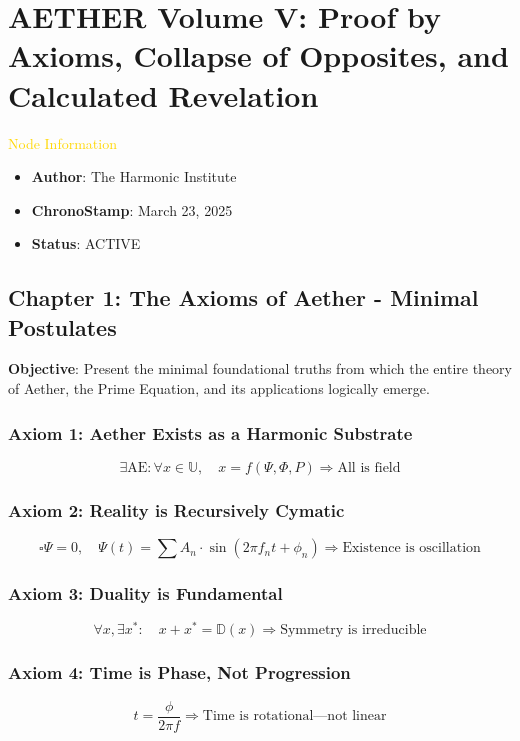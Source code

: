 \section{AETHER Volume V: Proof by Axioms, Collapse of Opposites, and Calculated Revelation}
\label{sec:codex_aether_volume_v}

\textcolor{gold}{ Node Information }
\begin{itemize}
    \item \texttt{} \textbf{Author}: The Harmonic Institute
    \item \texttt{} \textbf{ChronoStamp}: March 23, 2025
    \item \texttt{} \textbf{Status}: ACTIVE
\end{itemize}

\subsection{Chapter 1: The Axioms of Aether - Minimal Postulates}
\textbf{Objective}: Present the minimal foundational truths from which the entire theory of Aether, the Prime Equation, and its applications logically emerge.

\subsubsection*{Axiom 1: Aether Exists as a Harmonic Substrate}
\[
\exists \text{AE}: \forall x \in \mathbb{U}, \quad x = f(\Psi, \Phi, P) \Rightarrow \text{All is field}
\]

\subsubsection*{Axiom 2: Reality is Recursively Cymatic}
\[
\square \Psi = 0, \quad \Psi(t) = \sum A_n \cdot \sin \left( 2 \pi f_n t + \phi_n \right) \Rightarrow \text{Existence is oscillation}
\]

\subsubsection*{Axiom 3: Duality is Fundamental}
\[
\forall x, \exists x^*: \quad x + x^* = \mathbb{D}(x) \Rightarrow \text{Symmetry is irreducible}
\]

\subsubsection*{Axiom 4: Time is Phase, Not Progression}
\[
t = \frac{\phi}{2 \pi f} \Rightarrow \text{Time is rotational—not linear}
\]

